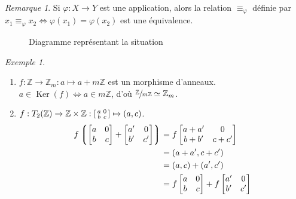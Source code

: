 \documentclass{report}
\theoremstyle{definition}
\theoremstyle{remark}
\newtheorem*{exem}{Exemple}
\newtheorem*{rmq}{Remarque}
\def\ZZ{\mathbb{Z}}
\def\im{\operatorname{Im}}
\def\noyau{\operatorname{Ker}}
\begin{document}
	\begin{rmq}
		Si $\varphi:X\to Y$ est une application, alors la relation $\equiv_\varphi$ d\'efinie par $x_1\equiv_\varphi x_2 \Longleftrightarrow \varphi(x_1)=\varphi(x_2)$ est une \'equivalence.

		\begin{figure}[h]
			\centering
			\caption{Diagramme repr\'esentant la situation}
		\end{figure}
	\end{rmq}

	\begin{exem}
		\begin{enumerate}
			\item $f:\ZZ\to\ZZ_m:a\mapsto a+m\ZZ$ est un morphisme d'anneaux. $a\in\noyau(f) \Longleftrightarrow a\in m\ZZ$, d'o\`u $\sfrac{\ZZ}{m\ZZ} \simeq \ZZ_m$.
			\item $f:T_2(\ZZ)\to\ZZ\times\ZZ : \begin{bsmallmatrix}
				a&0\\b&c
			\end{bsmallmatrix} \mapsto (a,c)$.
			\begin{align*}
				f\left\lgroup \begin{bmatrix}
					a&0\\b&c
				\end{bmatrix}+\begin{bmatrix}
					a'&0\\b'&c'
				\end{bmatrix} \right\rgroup&= f\begin{bmatrix}
					a+a'&0\\b+b'&c+c'
				\end{bmatrix}\\
				&= (a+a',c+c')\\
				&= (a,c)+(a',c')\\
				&= f\begin{bmatrix}
					a&0\\b&c
				\end{bmatrix}+f\begin{bmatrix}
					a'&0\\b'&c'
				\end{bmatrix}
			\end{align*}

\end{enumerate}
\end{exem}
\end{document}
